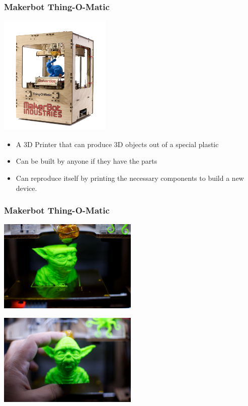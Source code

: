 \documentclass{beamer}
\begin{document}
\begin{frame}
  \frametitle{Makerbot Thing-O-Matic}
  \begin{center} \includegraphics[width=0.4\textwidth]{../img/thing-o-matic} \end{center}
  \begin{itemize}
  \item A \textcolor{beamer@myblue}{3D} Printer that can produce 3D
    objects out of a special plastic
  \item Can be built by anyone if they have the parts
  \item Can \textcolor{beamer@myblue}{reproduce} itself by printing the
    necessary components to build a new device.
  \end{itemize}
\end{frame}

\begin{frame}
  \frametitle{Makerbot Thing-O-Matic}
  \begin{center} 
    \includegraphics[width=0.5\textwidth]{../img/yoda}

    \includegraphics[width=0.5\textwidth]{../img/yoda-2} 
  \end{center}
\end{frame}
\end{document}
